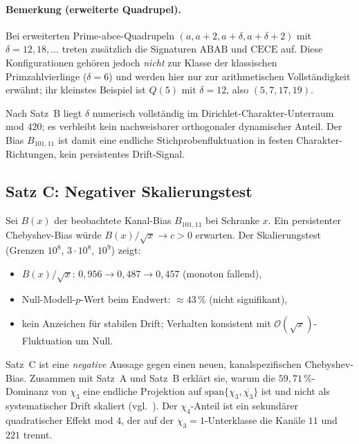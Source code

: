 \paragraph{Bemerkung (erweiterte Quadrupel).}
Bei erweiterten Prime-abce-Quadrupeln $(a,a+2,a+\delta,a+\delta+2)$ mit
$\delta=12,18,\ldots$ treten zusätzlich die Signaturen
$\mathrm{ABAB}$ und $\mathrm{CECE}$ auf.
Diese Konfigurationen gehören jedoch \emph{nicht} zur Klasse der
klassischen Primzahlvierlinge ($\delta=6$) und werden hier nur zur
arithmetischen Vollständigkeit erwähnt; ihr kleinstes Beispiel ist
$Q(5)$ mit $\delta=12$, also $(5,7,17,19)$.

\begin{corollary}[Spektrallücke]
\label{cor:spectral-gap}
Nach Satz~B liegt $\delta$ numerisch vollständig im Dirichlet-Charakter-Unterraum
mod $420$; es verbleibt kein nachweisbarer orthogonaler dynamischer Anteil.
Der Bias $B_{101,11}$ ist damit eine endliche Stichprobenfluktuation in
festen Charakter-Richtungen, kein persistentes Drift-Signal.
\end{corollary}

\subsection{Satz C: Negativer Skalierungstest}

\begin{theorem}
\label{thm:scaling}
Sei $B(x)$ der beobachtete Kanal-Bias $B_{101,11}$ bei Schranke $x$.
Ein persistenter Chebyshev-Bias würde $B(x)/\sqrt{x}\to c>0$ erwarten.
Der Skalierungstest (Grenzen $10^8$, $3\cdot 10^8$, $10^9$) zeigt:
\begin{itemize}
  \item $B(x)/\sqrt{x}$: $0{,}956 \to 0{,}487 \to 0{,}457$ (monoton fallend),
  \item Null-Modell-$p$-Wert beim Endwert: $\approx 43\,\%$ (nicht signifikant),
  \item kein Anzeichen für stabilen Drift; Verhalten konsistent mit
        $\mathcal{O}(\sqrt{x})$-Fluktuation um Null.
\end{itemize}
\end{theorem}

Satz~C ist eine \emph{negative} Aussage gegen einen neuen, kanalspezifischen
Chebyshev-Bias.
Zusammen mit Satz~A und Satz~B erklärt sie, warum die $59{,}71\,\%$-Dominanz
von $\chi_3$ eine endliche Projektion auf
$\mathrm{span}\{\chi_3,\overline{\chi_3}\}$ ist und nicht als
systematischer Drift skaliert
(vgl.~\cite{chebyshev1853,rubinstein2001}).
Der $\chi_4$-Anteil ist ein sekundärer quadratischer Effekt mod $4$,
der auf der $\chi_3=1$-Unterklasse die Kanäle $11$ und $221$ trennt.

